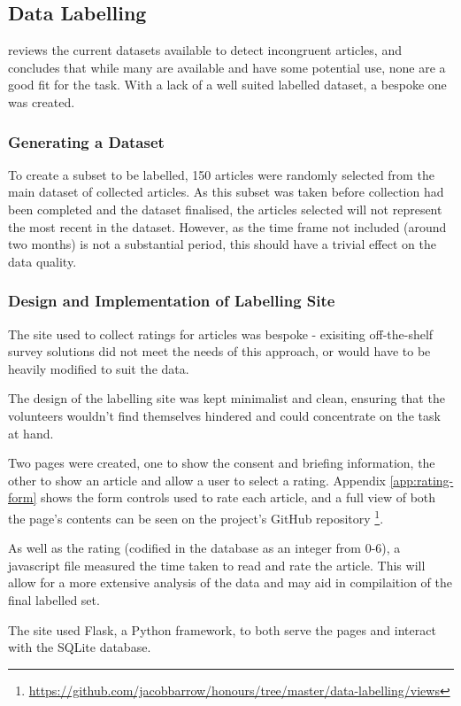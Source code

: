 \subsection{Data Labelling}
 reviews the current datasets available to detect incongruent articles, and concludes that while many are available and have some potential use, none are a good fit for the task. With a lack of a well suited labelled dataset, a bespoke one was created.

\subsubsection{Generating a Dataset}
To create a subset to be labelled, 150 articles were randomly selected from the main dataset of collected articles. As this subset was taken before collection had been completed and the dataset finalised, the articles selected will not represent the most recent in the dataset. However, as the time frame not included (around two months) is not a substantial period, this should have a trivial effect on the data quality.

\subsubsection{Design and Implementation of Labelling Site}
The site used to collect ratings for articles was bespoke - exisiting off-the-shelf survey solutions did not meet the needs of this approach, or would have to be heavily modified to suit the data.

The design of the labelling site was kept minimalist and clean, ensuring that the volunteers wouldn't find themselves hindered and could concentrate on the task at hand. 

Two pages were created, one to show the consent and briefing information, the other to show an article and allow a user to select a rating. Appendix \ref{app:rating-form} shows the form controls used to rate each article, and a full view of both the page's contents can be seen on the project's GitHub repository \footnote{\url{https://github.com/jacobbarrow/honours/tree/master/data-labelling/views}}.

As well as the rating (codified in the database as an integer from 0-6), a javascript file measured the time taken to read and rate the article. This will allow for a more extensive analysis of the data and may aid in compilaition of the final labelled set.

The site used Flask, a Python framework, to both serve the pages and interact with the SQLite database.

